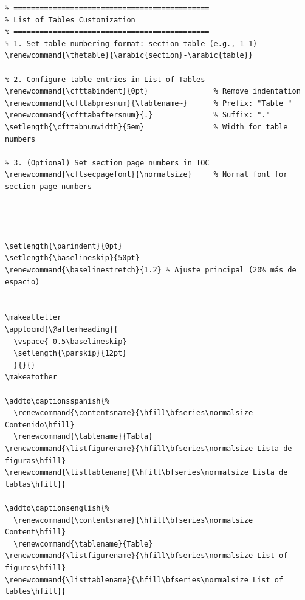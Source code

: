 \documentclass{reporti}
\begin{document}
\begin{verbatim}
% =============================================
% List of Tables Customization
% =============================================
% 1. Set table numbering format: section-table (e.g., 1-1)
\renewcommand{\thetable}{\arabic{section}-\arabic{table}}

% 2. Configure table entries in List of Tables
\renewcommand{\cfttabindent}{0pt}               % Remove indentation
\renewcommand{\cfttabpresnum}{\tablename~}      % Prefix: "Table "
\renewcommand{\cfttabaftersnum}{.}              % Suffix: "."
\setlength{\cfttabnumwidth}{5em}                % Width for table numbers

% 3. (Optional) Set section page numbers in TOC
\renewcommand{\cftsecpagefont}{\normalsize}     % Normal font for section page numbers




\setlength{\parindent}{0pt}
\setlength{\baselineskip}{50pt}
\renewcommand{\baselinestretch}{1.2} % Ajuste principal (20% más de espacio)


\makeatletter
\apptocmd{\@afterheading}{
  \vspace{-0.5\baselineskip}
  \setlength{\parskip}{12pt}
  }{}{}
\makeatother

\addto\captionsspanish{%
  \renewcommand{\contentsname}{\hfill\bfseries\normalsize Contenido\hfill}
  \renewcommand{\tablename}{Tabla}
\renewcommand{\listfigurename}{\hfill\bfseries\normalsize Lista de figuras\hfill}
\renewcommand{\listtablename}{\hfill\bfseries\normalsize Lista de tablas\hfill}}

\addto\captionsenglish{%
  \renewcommand{\contentsname}{\hfill\bfseries\normalsize Content\hfill}
  \renewcommand{\tablename}{Table}
\renewcommand{\listfigurename}{\hfill\bfseries\normalsize List of figures\hfill}
\renewcommand{\listtablename}{\hfill\bfseries\normalsize List of tables\hfill}}


\end{verbatim}
\end{document}
